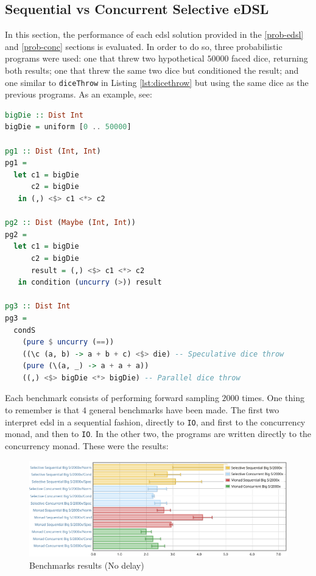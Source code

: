 \documentclass[
  oneside,
  11pt, a4paper,
  footinclude=true,
  headinclude=true,
  cleardoublepage=empty
]{scrbook}
\theoremstyle{definition}
\theoremstyle{definition}
\begin{document}
    \subsection{Sequential vs Concurrent Selective eDSL}
        In this section, the performance of each \gls{edsl} solution provided in the \ref{prob-edsl} and \ref{prob-conc} sections is evaluated. In order to do so, three probabilistic programs were used: one that threw two hypothetical $50000$ faced dice, returning both results; one that threw the same two dice but conditioned the result; and one similar to \texttt{diceThrow} in Listing \ref{lst:dicethrow} but using the same dice as the previous programs. As an example, see:
        
        \begin{lstlisting}[language=Haskell, caption={Programs used in evaluation}, captionpos=b]
bigDie :: Dist Int
bigDie = uniform [0 .. 50000]

pg1 :: Dist (Int, Int)
pg1 =
  let c1 = bigDie
      c2 = bigDie
   in (,) <$> c1 <*> c2

pg2 :: Dist (Maybe (Int, Int))
pg2 =
  let c1 = bigDie
      c2 = bigDie
      result = (,) <$> c1 <*> c2
   in condition (uncurry (>)) result

pg3 :: Dist Int
pg3 =
  condS
    (pure $ uncurry (==))
    ((\c (a, b) -> a + b + c) <$> die) -- Speculative dice throw
    (pure (\(a, _) -> a + a + a))
    ((,) <$> bigDie <*> bigDie) -- Parallel dice throw
        \end{lstlisting}{}
        
    Each benchmark consists of performing forward sampling $2000$ times. One thing to remember is that $4$ general benchmarks have been made. The first two interpret \gls{edsl} in a sequential fashion, directly to \texttt{IO}, and first to the concurrency monad, and then to \texttt{IO}. In the other two, the programs are written directly to the concurrency monad. These were the results:
    
    \begin{figure}[H]
        \centering
        \includegraphics[width=\linewidth]{img/no-delay.pdf}
        \caption{Benchmarks results (No delay)}
        \label{fig:no-delay}
    \end{figure}
    
\end{document}

